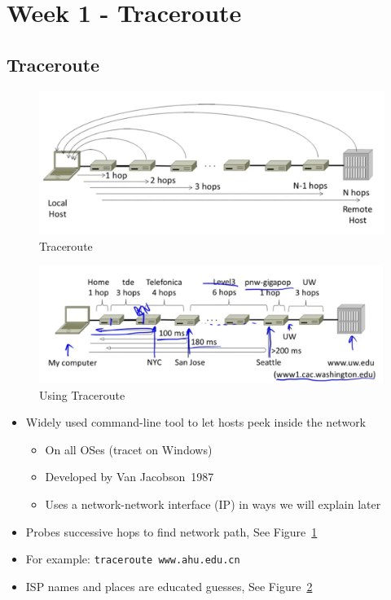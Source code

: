 \documentclass[12pt]{ctexart}   %
\begin{document}
\section{Week 1 - Traceroute}
	\subsection{Traceroute}
	
	\begin{figure}[h!] %
	 \centering
	 \includegraphics[scale=0.7]{images/1-5-1}
	\caption{ Traceroute }
	 \label{fig:1-5-1}
	 \end{figure}
	 
	 \begin{figure}[h!] %
	 \centering
	 \includegraphics[scale=0.7]{images/1-5-2}
	\caption{ Using Traceroute }
	 \label{fig:1-5-2}
	 \end{figure}
	 
	\begin{itemize}
		\item Widely used command-line tool to let hosts peek inside the network
		\begin{itemize}
			\item On all OSes (tracet on Windows)
			\item Developed by Van Jacobson~1987
			\item Uses a network-network interface (IP) in ways we will explain later
		\end{itemize}
		
		\item Probes successive hops to find network path, See Figure~\ref{fig:1-5-1}
		\item For example: \texttt{traceroute www.ahu.edu.cn}
		\item ISP names and places are educated guesses, See Figure~\ref{fig:1-5-2}
	\end{itemize}
\end{document}
